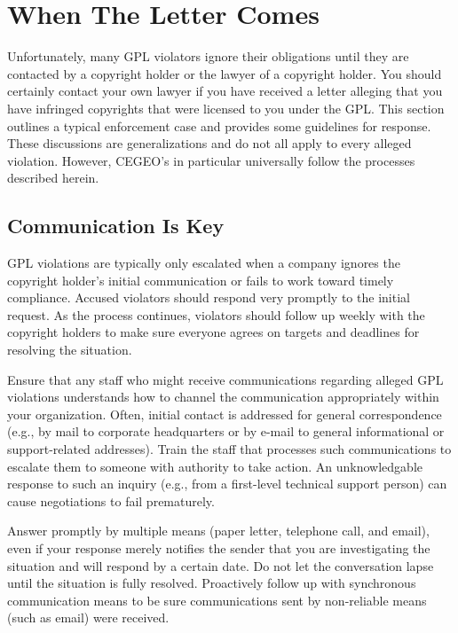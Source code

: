 \chapter{When The Letter Comes}

Unfortunately, many GPL violators ignore their obligations until they are
contacted by a copyright holder or the lawyer of a copyright holder.  You
should certainly contact your own lawyer if you have received a letter
alleging that you have infringed copyrights that were licensed to you
under the GPL\@.  This section outlines a typical enforcement case and
provides some guidelines for response.  These discussions are
generalizations and do not all apply to every alleged violation.  However,
CEGEO's in particular universally follow the processes described herein.

\section{Communication Is Key}

GPL violations are typically only escalated when a company ignores the
copyright holder's initial communication or fails to work toward timely
compliance.  Accused violators should respond very promptly to the
initial request.  As the process continues, violators should follow up weekly with the
copyright holders to make sure everyone agrees on targets and deadlines
for resolving the situation.

Ensure that any staff who might receive communications regarding alleged
GPL violations understands how to channel the communication appropriately
within your organization.  Often, initial contact is addressed for general
correspondence (e.g., by mail to corporate headquarters or by e-mail to
general informational or support-related addresses).  Train the staff that
processes such communications to escalate them to someone with authority
to take action.  An unknowledgable response to such an inquiry (e.g., from
a first-level technical support person) can cause negotiations to fail
prematurely.

Answer promptly by multiple means (paper letter, telephone call, and
email), even if your response merely notifies the sender that you are
investigating the situation and will respond by a certain date.  Do not
let the conversation lapse until the situation is fully resolved.
Proactively follow up with synchronous communication means to be sure
communications sent by non-reliable means (such as email) were received.

